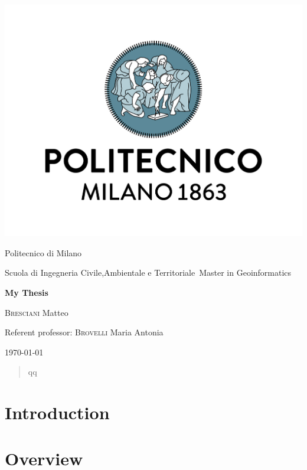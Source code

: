 \documentclass[fontsize=11pt,paper=a4,pagesize=auto]{report}
\begin{document}
\begin{titlepage}
	\centering
	\includegraphics[scale = 0.20]{images/polimi.jpg}\par
	{\Large
		Politecnico di Milano\par
		Scuola di Ingegneria Civile,Ambientale e Territoriale\
		Master in Geoinformatics\par}
			\vspace{0.5cm}
	{\huge\bfseries
		My Thesis\\\par}
	\vspace{1cm}
	{\Large
		{\scshape Bresciani} Matteo\par}
	\vfill
	Referent professor: {\scshape Brovelli} Maria Antonia\par
	\vfill
	{\large\today\par}
\end{titlepage}




\begin{abstract}

qq
\end{abstract}
\tableofcontents

\chapter{Introduction}
 

\chapter{Overview}
 
\end{document}
